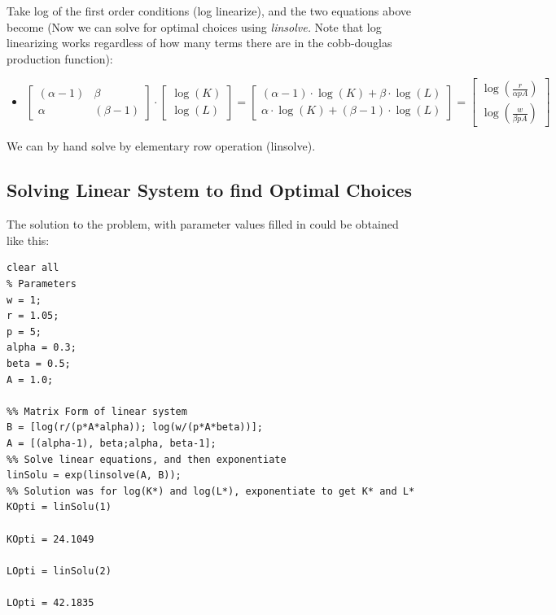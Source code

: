 \documentclass[
]{book}
\providecommand{\tightlist}{%
  \setlength{\itemsep}{0pt}\setlength{\parskip}{0pt}}
\begin{document}
Take log of the first order conditions (log linearize), and the two
equations above become (Now we can solve for optimal choices using
\emph{linsolve.} Note that log linearizing works regardless of how many terms
there are in the cobb-douglas production function):

\begin{itemize}
\tightlist
\item
  \(\displaystyle \left\lbrack \begin{array}{cc} (\alpha -1) & \beta \\ \alpha & (\beta -1) \end{array}\right\rbrack \cdot \left\lbrack \begin{array}{c} \log (K)\\ \log (L) \end{array}\right\rbrack =\left\lbrack \begin{array}{cc} (\alpha -1)\cdot \log (K)+\beta \cdot \log (L)\\ \alpha \cdot \log (K)+(\beta -1)\cdot \log (L) \end{array}\right\rbrack =\left\lbrack \begin{array}{c} \log \left(\frac{r}{\alpha pA}\right)\\ \log \left(\frac{w}{\beta pA}\right) \end{array}\right\rbrack\)
\end{itemize}

We can by hand solve by elementary row operation (linsolve).

\hypertarget{solving-linear-system-to-find-optimal-choices}{%
\subsection{Solving Linear System to find Optimal Choices}\label{solving-linear-system-to-find-optimal-choices}}

The solution to the problem, with parameter values filled in could be
obtained like this:

\begin{verbatim}
clear all
% Parameters
w = 1;
r = 1.05;
p = 5;
alpha = 0.3;
beta = 0.5;
A = 1.0;

%% Matrix Form of linear system
B = [log(r/(p*A*alpha)); log(w/(p*A*beta))];
A = [(alpha-1), beta;alpha, beta-1];
%% Solve linear equations, and then exponentiate
linSolu = exp(linsolve(A, B));
%% Solution was for log(K*) and log(L*), exponentiate to get K* and L*
KOpti = linSolu(1)

KOpti = 24.1049

LOpti = linSolu(2)

LOpti = 42.1835
\end{verbatim}
\end{document}
